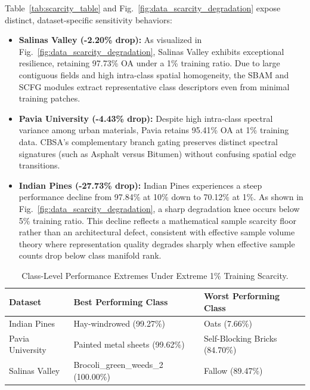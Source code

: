 \documentclass[manuscript,screen,review]{acmart}
\begin{document}
Table~\ref{tab:scarcity_table} and Fig.~\ref{fig:data_scarcity_degradation} expose distinct, dataset-specific sensitivity behaviors:
\begin{itemize}
    \item \textbf{Salinas Valley (-2.20\% drop):} As visualized in Fig.~\ref{fig:data_scarcity_degradation}, Salinas Valley exhibits exceptional resilience, retaining 97.73\% OA under a 1\% training ratio. Due to large contiguous fields and high intra-class spatial homogeneity, the SBAM and SCFG modules extract representative class descriptors even from minimal training patches.
    \item \textbf{Pavia University (-4.43\% drop):} Despite high intra-class spectral variance among urban materials, Pavia retains 95.41\% OA at 1\% training data. CBSA's complementary branch gating preserves distinct spectral signatures (such as Asphalt versus Bitumen) without confusing spatial edge transitions.
    \item \textbf{Indian Pines (-27.73\% drop):} Indian Pines experiences a steep performance decline from 97.84\% at 10\% down to 70.12\% at 1\%. As shown in Fig.~\ref{fig:data_scarcity_degradation}, a sharp degradation knee occurs below 5\% training ratio. This decline reflects a mathematical sample scarcity floor rather than an architectural defect, consistent with effective sample volume theory \cite{cui2019class} where representation quality degrades sharply when effective sample counts drop below class manifold rank.
\end{itemize}

\begin{table}[t]
\centering
\footnotesize
\caption{Class-Level Performance Extremes Under Extreme 1\% Training Scarcity.}
\label{tab:class_extremes_1percent}
\begin{tabular}{lll}
\toprule
\textbf{Dataset} & \textbf{Best Performing Class} & \textbf{Worst Performing Class} \\
\midrule
Indian Pines & Hay-windrowed (99.27\%) & Oats (7.66\%) \\
Pavia University & Painted metal sheets (99.62\%) & Self-Blocking Bricks (84.70\%) \\
Salinas Valley & Brocoli\_green\_weeds\_2 (100.00\%) & Fallow (89.47\%) \\
\bottomrule
\end{tabular}
\end{table}
\end{document}
